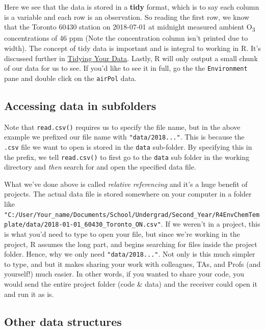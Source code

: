 \documentclass[
]{book}
\begin{document}
Here we see that the data is stored in a \textbf{tidy} format, which is to say each column is a variable and each row is an observation. So reading the first row, we know that the Toronto 60430 station on 2018-07-01 at midnight measured ambient O\textsubscript{3} concentrations of 46 ppm (Note the concentration column isn't printed due to width). The concept of tidy data is important and is integral to working in R. It's discussed further in \protect\hyperlink{tidying-your-data}{Tidying Your Data}. Lastly, R will only output a small chunk of our data for us to see. If you'd like to see it in full, go the the \texttt{Environment} pane and double click on the \texttt{airPol} data.

\hypertarget{accessing-data-in-subfolders}{%
\subsection{Accessing data in subfolders}\label{accessing-data-in-subfolders}}

Note that \texttt{read.csv()} requires us to specify the file name, but in the above example we prefixed our file name with \texttt{"data/2018..."}. This is because the \texttt{.csv} file we want to open is stored in the \texttt{data} sub-folder. By specifying this in the prefix, we tell \texttt{read.csv()} to first go to the \texttt{data} sub folder in the working directory and \emph{then} search for and open the specified data file.

What we've done above is called \emph{relative referencing} and it's a huge benefit of projects. The actual data file is stored somewhere on your computer in a folder like \texttt{"C:/User/Your\_name/Documents/School/Undergrad/Second\_Year/R4EnvChemTemplate/data/2018-01-01\_60430\_Toronto\_ON.csv"}. If we weren't in a project, this is what you'd need to type to open your file, but since we're working in the project, R assumes the long part, and begins searching for files inside the project folder. Hence, why we only need \texttt{"data/2018..."}. Not only is this much simpler to type, and but it makes sharing your work with colleagues, TAs, and Profs (and yourself!) much easier. In other words, if you wanted to share your code, you would send the entire project folder (code \& data) and the receiver could open it and run it as is.

\hypertarget{other-data-structures}{%
\subsection{Other data structures}\label{other-data-structures}}
\end{document}
